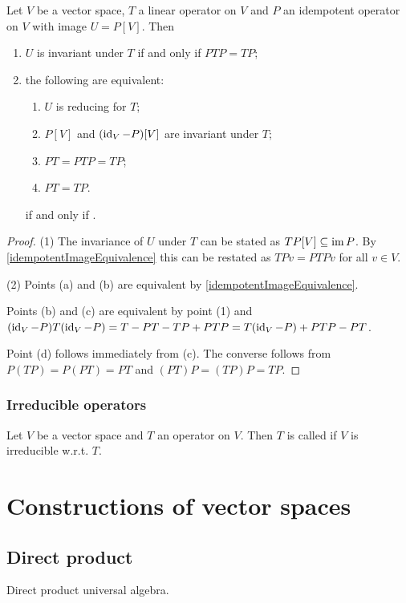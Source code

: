 \begin{lemma}
Let $V$ be a vector space, $T$ a linear operator on $V$ and $P$ an idempotent operator on $V$ with image $U = P[V]$. Then 
\begin{enumerate}
\item $U$ is invariant under $T$ \textup{if and only if} $PTP = TP$;
\item the following are equivalent:
\begin{enumerate}
\item $U$ is reducing for $T$;
\item $P[V]$ and $(\operatorname{id}_V - P)[V]$ are invariant under $T$;
\item $PT = PTP = TP$;
\item $PT = TP$.
\end{enumerate} \textup{if and only if} .
\end{enumerate}
\end{lemma}
\begin{proof}
(1) The invariance of $U$ under $T$ can be stated as $TP[V] \subseteq \operatorname{im} P$. By \ref{idempotentImageEquivalence} this can be restated as $TPv = PTPv$ for all $v\in V$.

(2) Points (a) and (b) are equivalent by \ref{idempotentImageEquivalence}.

Points (b) and (c) are equivalent by point (1) and $(\operatorname{id}_V - P)T(\operatorname{id}_V - P) = T - PT - TP + PTP = T(\operatorname{id}_V - P) + PTP - PT$.

Point (d) follows immediately from (c). The converse follows from $P(TP) = P(PT) = PT$ and $(PT)P = (TP)P = TP$.
\end{proof}

\subsubsection{Irreducible operators}
\begin{definition}
Let $V$ be a vector space and $T$ an operator on $V$. Then $T$ is called  if $V$ is irreducible w.r.t. $T$.
\end{definition}

\section{Constructions of vector spaces}
\subsection{Direct product}
\begin{definition}
Direct product universal algebra.
\end{definition}


